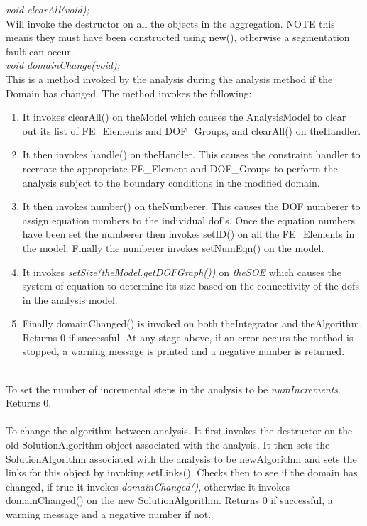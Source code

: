 {\em void clearAll(void);} \\
Will invoke the destructor on all the objects in the aggregation. NOTE
this means they must have been constructed using new(),
otherwise a segmentation fault can occur.\\

{\em void domainChange(void);}\\
This is a method invoked by the analysis during the analysis method if
the Domain has changed. The method invokes the following:
\begin{enumerate} 
\item It invokes clearAll() on \p theModel which causes the
AnalysisModel to clear out its list of FE\_Elements and DOF\_Groups,
and clearAll() on \p theHandler.
\item It then invokes handle() on \p theHandler. This causes
the constraint handler to recreate the appropriate FE\_Element and
DOF\_Groups to perform the analysis subject to the boundary conditions
in the modified domain.
\item It then invokes number() on \p theNumberer. This causes
the DOF numberer to assign equation numbers to the individual
dof's. Once the equation numbers have been set the numberer then
invokes setID() on all the FE\_Elements in the model. Finally
the numberer invokes setNumEqn() on the model.
\item It invokes {\em setSize(theModel.getDOFGraph())} on {\em
theSOE} which causes the system of equation to determine its size
based on the connectivity of the dofs in the analysis model. 
\item Finally domainChanged() is invoked on both \p theIntegrator and 
\p theAlgorithm. 
Returns $0$ if successful. At any stage above, if an error occurs the
method is stopped, a warning message is printed and a negative number
is returned. \\ 
\end{enumerate}

\\ 
To set the number of incremental steps in the analysis to be {\em
numIncrements}. Returns $0$.\\

\\
To change the algorithm between analysis. It first invokes the
destructor on the old SolutionAlgorithm object associated with the
analysis. It then sets the SolutionAlgorithm 
associated with the analysis to be \p newAlgorithm and sets the
links for this object by invoking setLinks(). Checks then to
see if the domain has changed, if true it invokes {\em
domainChanged()}, otherwise it invokes domainChanged() on the
new SolutionAlgorithm. Returns $0$ if successful, a warning message
and a negative number if not.\\

